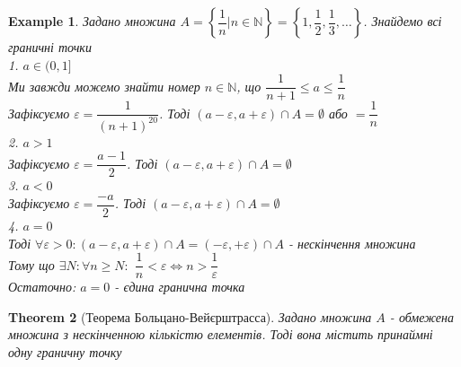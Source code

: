 \documentclass[a4paper, 14pt]{extarticle}
\def\bigline{\vspace{5mm}\\}
\theoremstyle{theoremdd}
\newtheorem{theorem}{Theorem}[subsection]
\theoremstyle{theoremdd}
\theoremstyle{theoremdd}
\theoremstyle{theoremdd}
\newtheorem{example}[theorem]{Example}
\theoremstyle{theoremdd}
\theoremstyle{theoremdd}
\theoremstyle{theoremdd}
\theoremstyle{theoremdd}
\begin{document}
	\begin{example}
	Задано множина $A = \left\{\dfrac{1}{n} | n \in \mathbb{N} \right\} = \left\{1, \dfrac{1}{2}, \dfrac{1}{3}, \dots \right\}$. Знайдемо всі граничні точки\\
	1. $a \in (0,1]$\\
	Ми завжди можемо знайти номер $n \in \mathbb{N}$, що $\dfrac{1}{n+1} \leq a \leq \dfrac{1}{n}$\\
	Зафіксуємо $\varepsilon = \dfrac{1}{(n+1)^{20}}$. Тоді $(a-\varepsilon,a+\varepsilon) \cap A = \emptyset$ або $= \dfrac{1}{n}$
	\bigline
	2. $a > 1$\\
	Зафіксуємо $\varepsilon = \dfrac{a-1}{2}$. Тоді $(a-\varepsilon,a+\varepsilon) \cap A = \emptyset$
	\bigline
	3. $a < 0$\\
	Зафіксуємо $\varepsilon = \dfrac{-a}{2}$. Тоді $(a-\varepsilon,a+\varepsilon) \cap A = \emptyset$
	\bigline
	4. $a = 0$\\
	Тоді $\forall \varepsilon > 0: (a-\varepsilon,a+\varepsilon) \cap A = (-\varepsilon, + \varepsilon) \cap A$ - нескінчення множина\\
	Тому що $\exists N: \forall n \geq N:$ $\dfrac{1}{n} < \varepsilon \iff n > \dfrac{1}{\varepsilon}$\\
	Остаточно: $a = 0$ - єдина гранична точка
	\end{example}
	
	\begin{theorem}[Теорема Больцано-Вейєрштрасса]
	Задано множина $A$ - обмежена множина з нескінченною кількістю елементів. Тоді вона містить принаймні одну граничну точку
	\end{theorem}
	
\end{document}

